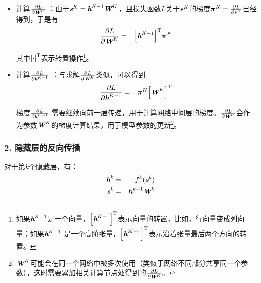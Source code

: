 \begin{itemize}
\vspace{0.5em}
\item 计算$ \frac{\partial L}{\partial {\textbf{\em W}}^K} $ ：由于$ {\textbf{\em s}}^K={\textbf{\em h}}^{K-1}{\textbf{\em W}}^K $，且损失函数$ L $关于$ {\textbf{\em s}}^K $的梯度$ {\bm \pi}^K= \frac{\partial L}{\partial {\textbf{\em s}}^K} $已经得到，于是有
\begin{eqnarray}
\frac{\partial L}{\partial {\textbf{\em W}}^K}&=&{\left[{\textbf{\em h}}^{K-1}\right]}^{\textrm T} {\bm \pi}^K
\label{eq:9-50}
\end{eqnarray}

其中${[\cdot]}^{\textrm T}$表示转置操作\footnote{如果$ {\textbf{\em h}}^{K-1} $是一个向量，$ {\left[{\textbf{\em h}}^{K-1}\right]}^{\textrm T} $表示向量的转置，比如，行向量变成列向量；如果$ {\textbf{\em h}}^{K-1} $ 是一个高阶张量，$ {\left[{\textbf{\em h}}^{K-1}\right]}^{\textrm T} $表示沿着张量最后两个方向的转置。}。
\vspace{0.5em}
\item 计算$ \frac{\partial L}{\partial{\textbf{\em h}}^{K-1}} $ ：与求解$ \frac{\partial L}{\partial {\textbf{\em W}}^K} $类似，可以得到
\begin{eqnarray}
\frac{\partial L}{\partial {\textbf{\em h}}^{K-1}}&=&{\bm \pi}^K{\left[{\textbf{\em W}}^K\right]}^{\textrm T}
\label{eq:9-51}
\end{eqnarray}

梯度$ \frac{\partial L}{\partial {\textbf{\em h}}^{K-1}} $ 需要继续向前一层传递，用于计算网络中间层的梯度。$ \frac{\partial L}{\partial {\textbf{\em W}}^K} $会作为参数$ {\textbf{\em W}}^K $的梯度计算结果，用于模型参数的更新\footnote{$ {\textbf{\em W}}^K $可能会在同一个网络中被多次使用（类似于网络不同部分共享同一个参数），这时需要累加相关计算节点处得到的$ \frac{\partial L}{\partial {\textbf{\em W}}^K} $。}。
\vspace{0.5em}
\end{itemize}


\subsubsection{2. 隐藏层的反向传播}

\parinterval  对于第$ k $个隐藏层，有：
\begin{eqnarray}
{\textbf{\em h}}^k&=&f^k({\textbf{\em s}}^k) \label{eq:9-52}\\
{\textbf{\em s}}^k&=&{\textbf{\em h}}^{k-1}{\textbf{\em W}}^k
\label{eq:9-53}
\end{eqnarray}

